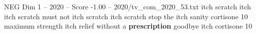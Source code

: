 \begin{textsample}{NEG Dim 1 – 2020 – Score -1.00 – 2020/tv\_com\_2020\_53.txt}  \label{ex:f1_neg_012}
itch scratch itch itch scratch must not itch scratch itch scratch stop the itch sanity cortisone 10 maximum strength itch relief without a \textbf{prescription} goodbye itch cortisone 10

\end{textsample}
